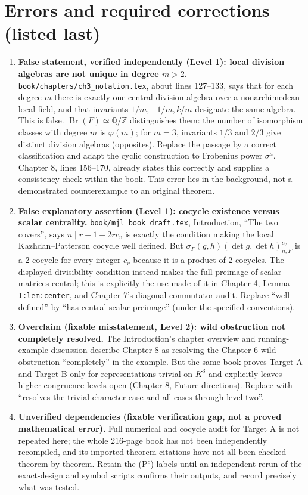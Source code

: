 \documentclass[12pt,letterpaper]{article}
\begin{document}
\section{Errors and required corrections (listed last)}
\begin{enumerate}[leftmargin=*,label=\textbf{E\arabic*.}]
\item \textbf{False statement, verified independently (Level 1): local
division algebras are not unique in degree $m>2$.}
\texttt{book/chapters/ch3\_notation.tex}, about lines 127--133,
says that for each degree $m$ there is exactly one central division
algebra over a nonarchimedean local field, and that invariants
$1/m,-1/m,k/m$ designate the same algebra. This is false.
$\operatorname{Br}(F)\simeq\mathbb Q/\mathbb Z$ distinguishes them:
the number of isomorphism classes with degree $m$ is $\varphi(m)$;
for $m=3$, invariants $1/3$ and $2/3$ give distinct division
algebras (opposites). Replace the passage by a correct classification
and adapt the cyclic construction to Frobenius power $\sigma^a$.
Chapter 8, lines 156--170, already states this correctly and supplies
a consistency check within the book. This error lies in the background,
not a demonstrated counterexample to an original theorem.

\item \textbf{False explanatory assertion (Level 1): cocycle existence
versus scalar centrality.} \texttt{book/mjl\_book\_draft.tex},
Introduction, ``The two covers'', says $n\mid r-1+2rc_v$ is exactly
the condition making the local Kazhdan--Patterson cocycle well defined.
But $\sigma_F(g,h)(\det g,\det h)_{n,F}^{c_v}$ is a 2-cocycle
for every integer $c_v$ because it is a product of 2-cocycles.
The displayed divisibility condition instead makes the full preimage
of scalar matrices central; this is explicitly the use made of it
in Chapter 4, Lemma \texttt{I:lem:center}, and Chapter 7's diagonal
commutator audit. Replace ``well defined'' by ``has central scalar
preimage'' (under the specified conventions).

\item \textbf{Overclaim (fixable misstatement, Level 2): wild obstruction
not completely resolved.} The Introduction's chapter overview and
running-example discussion describe Chapter 8 as resolving the
Chapter 6 wild obstruction ``completely'' in the example. But the
same book proves Target A and Target B only for representations
trivial on $K^3$ and explicitly leaves higher congruence levels
open (Chapter 8, Future directions). Replace with ``resolves the
trivial-character case and all cases through level two''.

\item \textbf{Unverified dependencies (fixable verification gap, not a
proved mathematical error).} Full numerical and cocycle audit for
Target A is not repeated here; the whole 216-page book has not
been independently recompiled, and its imported theorem citations
have not all been checked theorem by theorem. Retain the (P$^c$)
labels until an independent rerun of the exact-design and symbol
scripts confirms their outputs, and record precisely what was tested.
\end{enumerate}
\end{document}
